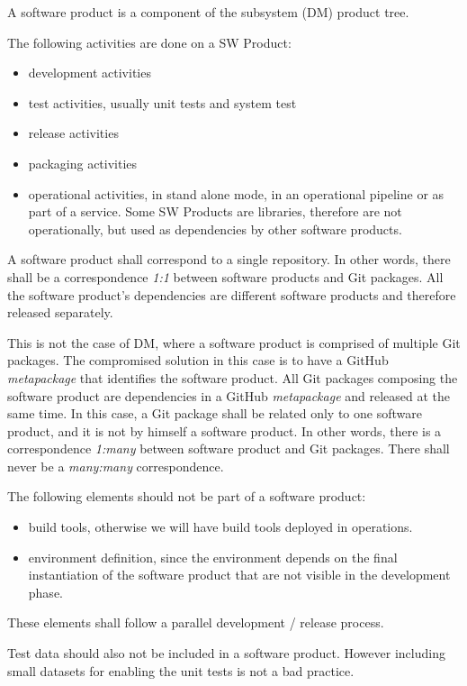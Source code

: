 A software product is a component of the subsystem (\gls{DM}) product tree.

The following activities are done on a \gls{SW} Product:
\begin{itemize}
\item development activities
\item test activities, usually unit tests and system test
\item release activities
\item packaging activities
\item operational activities, in stand alone mode, in an operational \gls{pipeline} or as part of a service. Some \gls{SW} Products are libraries, therefore are not operationally, but used as dependencies by other software products.
\end{itemize}

A software product shall correspond to a single repository.
In other  words, there shall be a correspondence \textit{1:1} between software products and Git packages.
All the software product's dependencies are different software products and therefore released separately.

This is not the case of \gls{DM}, where a software product is comprised of multiple Git packages.
The compromised solution in this case is to have a GitHub \textit{metapackage} that identifies the software product.
All Git packages composing the software product are dependencies in a GitHub \textit{metapackage} and released at the same time.
In this case, a Git package shall be related only to one software product, and it is not by himself a software product.
In other words, there is a correspondence \textit{1:many} between software product and Git packages.
There shall never be a \textit{many:many} correspondence.

The following elements should not be part of a software product:

\begin{itemize}
\item build tools, otherwise we will have build tools deployed in operations.
\item environment definition, since the environment depends on the final instantiation of the software product that are not visible in the development phase.
\end{itemize}

These elements shall follow a parallel development / release process.

Test data should also not be included in a software product. However including small datasets for enabling the unit tests is not a bad practice.

